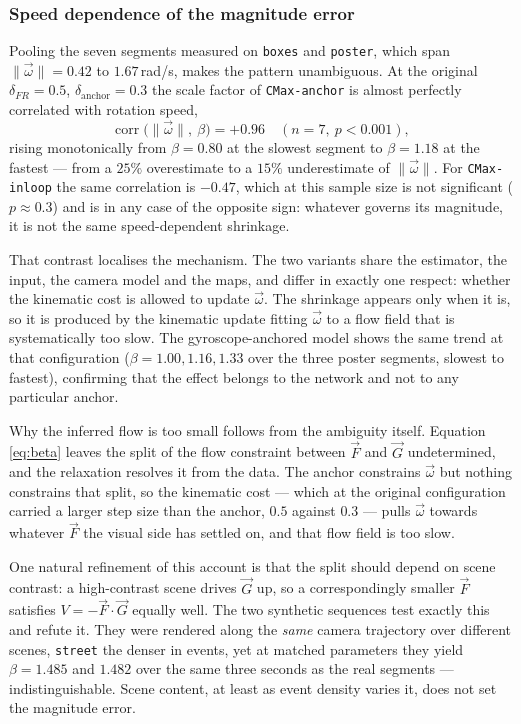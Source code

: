 \documentclass[journal]{IEEEtran}
\newcommand{\Vmap}{V}
\newcommand{\Gmap}{\vec{G}}
\newcommand{\Fmap}{\vec{F}}
\newcommand{\wvec}{\vec{\omega}}
\begin{document}
\subsubsection{Speed dependence of the magnitude error}
\label{sec:speed}
Pooling the seven segments measured on \texttt{boxes} and \texttt{poster},
which span $\|\wvec\| = 0.42$ to $1.67$\,rad/s, makes the pattern unambiguous. At the
original $\delta_{F\!R} = 0.5$, $\delta_{\text{anchor}} = 0.3$ the scale factor
of \texttt{CMax-anchor} is almost perfectly correlated with rotation speed,
\begin{equation}
\operatorname{corr}\big(\|\wvec\|,\ \beta\big) = +0.96 \quad (n=7,\ p<0.001),
\label{eq:betacorr}
\end{equation}
rising monotonically from $\beta = 0.80$ at the slowest segment to
$\beta = 1.18$ at the fastest --- from a $25\%$ overestimate to a $15\%$
underestimate of $\|\wvec\|$. For \texttt{CMax-inloop} the same correlation is $-0.47$, which at
this sample size is not significant ($p \approx 0.3$) and is in any case of the
opposite sign: whatever governs its magnitude, it is not the same
speed-dependent shrinkage.

That contrast localises the mechanism. The two variants share the estimator, the
input, the camera model and the maps, and differ in exactly one respect: whether
the kinematic cost is allowed to update $\wvec$. The shrinkage appears only when
it is, so it is produced by the kinematic update fitting $\wvec$ to a flow field
that is systematically too slow. The gyroscope-anchored model shows the same
trend at that configuration ($\beta = 1.00, 1.16, 1.33$ over the three poster
segments, slowest to fastest), confirming that the effect belongs to the network and
not to any particular anchor.

Why the inferred flow is too small follows from the ambiguity itself. Equation
\eqref{eq:beta} leaves the split of the flow constraint between $\Fmap$ and
$\Gmap$ undetermined, and the relaxation resolves it from the data. The anchor
constrains $\wvec$ but nothing constrains that split, so the kinematic cost ---
which at the original configuration carried a larger step size than the anchor,
$0.5$ against $0.3$ --- pulls $\wvec$ towards whatever $\Fmap$ the visual
side has settled on, and that flow field is too slow.

One natural refinement of this account is that the split should depend on scene
contrast: a high-contrast scene drives $\Gmap$ up, so a correspondingly smaller
$\Fmap$ satisfies $\Vmap = -\Fmap\cdot\Gmap$ equally well. The two synthetic
sequences test exactly this and refute it. They were rendered along the
\emph{same} camera trajectory over different scenes, \texttt{street} the
denser in events, yet at matched parameters they yield
$\beta = 1.485$ and $1.482$ over the same three seconds as the real segments
--- indistinguishable. Scene content, at least as
event density varies it, does not set the magnitude error.
\end{document}
